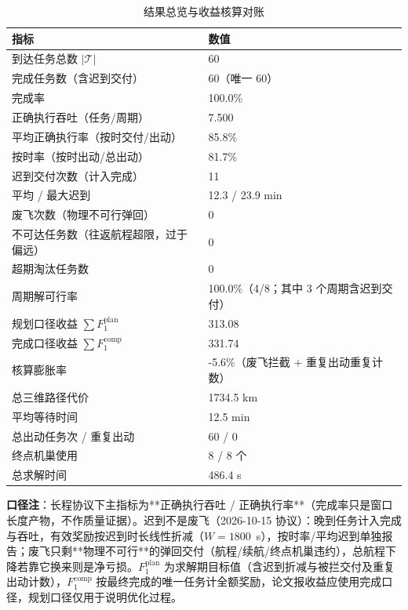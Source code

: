 \documentclass[a4paper,11pt]{article}
\begin{document}
\begin{table}[htbp]\centering
\caption{结果总览与收益核算对账}
\label{tab:exp01-outcome}
\begin{tabular}{ll}
\toprule
指标 & 数值 \\
\midrule
到达任务总数 $|\mathcal{T}|$ & 60 \\
完成任务数（含迟到交付） & 60（唯一 60） \\
完成率 & 100.0\% \\
正确执行吞吐（任务/周期） & 7.500 \\
平均正确执行率（按时交付/出动） & 85.8\% \\
按时率（按时出动/总出动） & 81.7\% \\
迟到交付次数（计入完成） & 11 \\
平均 / 最大迟到 & 12.3 / 23.9 min \\
废飞次数（物理不可行弹回） & 0 \\
不可达任务数（往返航程超限，过于偏远） & 0 \\
超期淘汰任务数 & 0 \\
周期解可行率 & 100.0\%（4/8；其中 3 个周期含迟到交付） \\
规划口径收益 $\sum F_1^{\mathrm{plan}}$ & 313.08 \\
完成口径收益 $\sum F_1^{\mathrm{comp}}$ & 331.74 \\
核算膨胀率 & -5.6\%（废飞拦截 + 重复出动重复计数） \\
总三维路径代价 & 1734.5 km \\
平均等待时间 & 12.5 min \\
总出动任务次 / 重复出动 & 60 / 0 \\
终点机巢使用 & 8 / 8 个 \\
总求解时间 & 486.4 s \\
\bottomrule
\end{tabular}

\vspace{2pt}\parbox{0.92\linewidth}{\footnotesize \textbf{口径注}：长程协议下主指标为**正确执行吞吐 / 正确执行率**（完成率只是窗口长度产物，不作质量证据）。迟到不是废飞（2026-10-15 协议）：晚到任务计入完成与吞吐，有效奖励按迟到时长线性折减（$W=1800$~s），按时率/平均迟到单独报告；废飞只剩**物理不可行**的弹回交付（航程/续航/终点机巢违约），总航程下降若靠它换来则是净亏损。$F_1^{\mathrm{plan}}$ 为求解期目标值（含迟到折减与被拦交付及重复出动计数），$F_1^{\mathrm{comp}}$ 按最终完成的唯一任务计全额奖励，论文报收益应使用完成口径，规划口径仅用于说明优化过程。}
\end{table}
\end{document}
